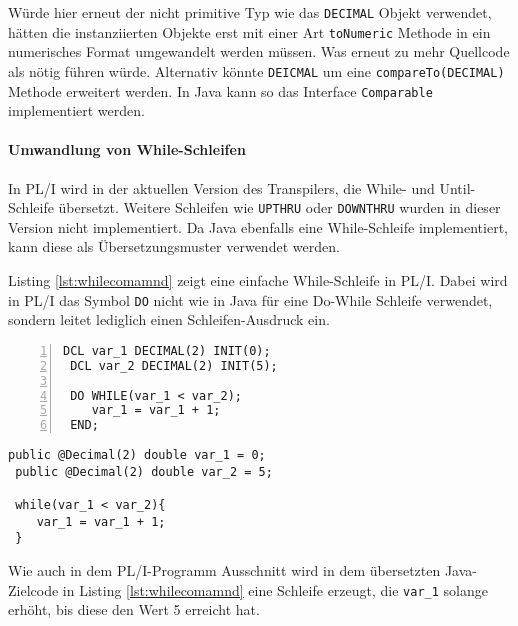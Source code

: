 Würde hier erneut der nicht primitive Typ wie das \verb+DECIMAL+ Objekt verwendet, hätten die instanziierten Objekte erst mit einer Art \verb+toNumeric+ Methode in ein numerisches Format umgewandelt werden müssen. Was erneut zu mehr Quellcode als nötig führen würde. Alternativ könnte \verb+DEICMAL+ um eine \verb+compareTo(DECIMAL)+ Methode erweitert werden. In Java kann so das Interface \verb+Comparable+ implementiert werden. 

\paragraph*{Umwandlung von While-Schleifen}
In PL/I wird in der aktuellen Version des Transpilers, die  While- und Until-Schleife übersetzt.
Weitere Schleifen wie \verb+UPTHRU+ oder \verb+DOWNTHRU+ wurden in dieser Version nicht implementiert.
Da Java ebenfalls eine While-Schleife implementiert, kann diese als Übersetzungsmuster verwendet werden. 


Listing \ref{lst:whilecomamnd} zeigt eine einfache While-Schleife in PL/I.
Dabei wird in PL/I das Symbol \verb+DO+ nicht wie in Java für eine Do-While
Schleife verwendet, sondern leitet lediglich einen Schleifen-Ausdruck ein.

\begin{minipage}[b]{0.48\linewidth}
	\centering
	\lstset{language=PL/I,label=SliceExaple}
	\begin{lstlisting}[frame=single, numbers=left, mathescape,%
		caption={Transformation While-Schleife}, label={lst:whilecomamnd}, basicstyle=\fontsize{9}{13}\selectfont\ttfamily]
 DCL var_1 DECIMAL(2) INIT(0);
 DCL var_2 DECIMAL(2) INIT(5);
		
 DO WHILE(var_1 < var_2);
 	var_1 = var_1 + 1;
 END;
	\end{lstlisting}
\end{minipage}
\hspace{0.5cm}
\begin{minipage}[b]{0.48\linewidth}
	\centering
	\lstset{language=Java,label=SliceExaple}
	\begin{lstlisting}[frame=single, mathescape,%
		title={" "}, basicstyle=\fontsize{9}{13}\selectfont\ttfamily]
 public @Decimal(2) double var_1 = 0;
 public @Decimal(2) double var_2 = 5;
		
 while(var_1 < var_2){
 	var_1 = var_1 + 1;
 }
	\end{lstlisting}
\end{minipage} 

Wie auch in dem PL/I-Programm Ausschnitt wird in dem übersetzten Java-Zielcode in Listing \ref{lst:whilecomamnd} eine Schleife erzeugt, die \verb+var_1+ solange erhöht, bis diese den Wert 5 erreicht hat.

